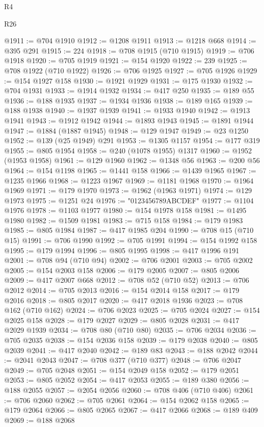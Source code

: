 \begin{lexlean}{R4}
\begin{lexlean}{R26}
\begin{coremodule}
{{{{{{{{{{{{{{{{{{{{{{{{{{{{{{{{{{{{{{{{{{{{{{{{{{{{{{{{{{{{{{{{{{{{{{{{@1911 := @704 @1910
@1912 := @1208 @1911
@1913 := @1218 @668
@1914 := @395 @291
@1915 := 224
@1918 := @708 @1915 (@710 @1915)
@1919 := @706 @1918
@1920 := @705 @1919
@1921 := @154 @1920
@1922 := 239
@1925 := @708 @1922 (@710 @1922)
@1926 := @706 @1925
@1927 := @705 @1926
@1929 := @154 @1927 @158
@1930 := @1921 @1929
@1931 := @175 @1930
@1932 := @704 @1931
@1933 := @1914 @1932
@1934 := @417 @250
@1935 := @189 @55
@1936 := @188 @1935
@1937 := @1934 @1936
@1938 := @189 @165
@1939 := @188 @1938
@1940 := @1937 @1939
@1941 := @1933 @1940
@1942 := @1913 @1941
@1943 := @1912 @1942
@1944 := @1893 @1943
@1945 := @1891 @1944
@1947 := @1884 (@1887 @1945)
@1948 := @129 @1947
@1949 := @23 @1250
@1952 := @139 (@25 @1949) @291
@1953 := @1305 @1157
@1954 := @177 @319
@1955 := @805 @1954
@1958 := @240 (@1078 @1955) @1317
@1960 := @1952 (@1953 @1958)
@1961 := @129 @1960
@1962 := @1348 @56
@1963 := @200 @56
@1964 := @154 @1198
@1965 := @1441 @158
@1966 := @1439 @1965
@1967 := @1235 @1966
@1968 := @1223 @1967
@1969 := @1181 @1968
@1970 := @1964 @1969
@1971 := @179 @1970
@1973 := @1962 (@1963 @1971)
@1974 := @129 @1973
@1975 := @1251 @24
@1976 := "0123456789ABCDEF"
@1977 := @1104 @1976
@1978 := @1103 @1977
@1980 := @154 @1978 @158
@1981 := @1495 @1980
@1982 := @1509 @1981
@1983 := @715 @158
@1984 := @179 @1983
@1985 := @805 @1984
@1987 := @417 @1985 @204
@1990 := @708 @15 (@710 @15)
@1991 := @706 @1990
@1992 := @705 @1991
@1994 := @154 @1992 @158
@1995 := @179 @1994
@1996 := @805 @1995
@1998 := @417 @1996 @191
@2001 := @708 @94 (@710 @94)
@2002 := @706 @2001
@2003 := @705 @2002
@2005 := @154 @2003 @158
@2006 := @179 @2005
@2007 := @805 @2006
@2009 := @417 @2007 @668
@2012 := @708 @52 (@710 @52)
@2013 := @706 @2012
@2014 := @705 @2013
@2016 := @154 @2014 @158
@2017 := @179 @2016
@2018 := @805 @2017
@2020 := @417 @2018 @1936
@2023 := @708 @162 (@710 @162)
@2024 := @706 @2023
@2025 := @705 @2024
@2027 := @154 @2025 @158
@2028 := @179 @2027
@2029 := @805 @2028
@2031 := @417 @2029 @1939
@2034 := @708 @80 (@710 @80)
@2035 := @706 @2034
@2036 := @705 @2035
@2038 := @154 @2036 @158
@2039 := @179 @2038
@2040 := @805 @2039
@2041 := @417 @2040
@2042 := @189 @83
@2043 := @188 @2042
@2044 := @2041 @2043
@2047 := @708 @377 (@710 @377)
@2048 := @706 @2047
@2049 := @705 @2048
@2051 := @154 @2049 @158
@2052 := @179 @2051
@2053 := @805 @2052
@2054 := @417 @2053
@2055 := @189 @380
@2056 := @188 @2055
@2057 := @2054 @2056
@2060 := @708 @406 (@710 @406)
@2061 := @706 @2060
@2062 := @705 @2061
@2064 := @154 @2062 @158
@2065 := @179 @2064
@2066 := @805 @2065
@2067 := @417 @2066
@2068 := @189 @409
@2069 := @188 @2068
}}}}}}}}}}}}}}}}}}}}}}}}}}}}}}}}}}}}}}}}}}}}}}}}}}}}}}}}}}}}}}}}}}}}}}}}
\end{coremodule}
\end{lexlean}
\end{lexlean}
